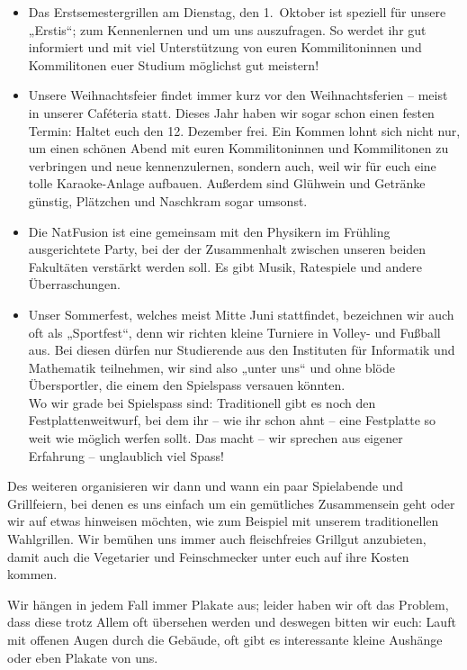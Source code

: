 \begin{itemize}
    \item Das Erstsemestergrillen am Dienstag, den 1.~Oktober ist speziell für unsere „Erstis“; zum Kennenlernen und um uns auszufragen.
          So werdet ihr gut informiert und mit viel Unterstützung von euren Kommilitoninnen und Kommilitonen euer Studium möglichst gut meistern!
    \item Unsere Weihnachtsfeier findet immer kurz vor den Weihnachtsferien -- meist in unserer Caféteria statt.
          Dieses Jahr haben wir sogar schon einen festen Termin: Haltet euch den 12. Dezember frei.
          Ein Kommen lohnt sich nicht nur, um einen schönen Abend mit euren Kommilitoninnen und Kommilitonen zu verbringen und neue kennenzulernen,
          sondern auch, weil wir für euch eine tolle Karaoke-Anlage aufbauen.
          Außerdem sind Glühwein und Getränke günstig, Plätzchen und Naschkram sogar umsonst.
    \item Die NatFusion ist eine gemeinsam mit den Physikern im Frühling ausgerichtete Party,
          bei der der Zusammenhalt zwischen unseren beiden Fakultäten verstärkt werden soll.
          Es gibt Musik, Ratespiele und andere Überraschungen.
    \item Unser Sommerfest, welches meist Mitte Juni stattfindet, bezeichnen wir auch oft als „Sportfest“,
          denn wir richten kleine Turniere in Volley- und Fußball aus.
          Bei diesen dürfen nur Studierende aus den Instituten für Informatik und Mathematik teilnehmen, wir sind also „unter uns“
          und ohne blöde Übersportler, die einem den Spielspass versauen könnten.\\
          Wo wir grade bei Spielspass sind: Traditionell gibt es noch den Festplattenweitwurf,
          bei dem ihr -- wie ihr schon ahnt -- eine Festplatte so weit wie möglich werfen sollt.
          Das macht -- wir sprechen aus eigener Erfahrung -- unglaublich viel Spass!
\end{itemize}

Des weiteren organisieren wir dann und wann ein paar Spielabende und Grillfeiern, bei denen es uns einfach um ein gemütliches Zusammensein geht oder wir auf etwas hinweisen möchten, wie zum Beispiel mit unserem traditionellen Wahlgrillen.
Wir bemühen uns immer auch fleischfreies Grillgut anzubieten, damit auch die Vegetarier und Feinschmecker unter euch auf ihre Kosten kommen.

Wir hängen in jedem Fall immer Plakate aus; leider haben wir oft das Problem, dass diese trotz Allem oft übersehen werden und deswegen bitten wir euch:
Lauft mit offenen Augen durch die Gebäude, oft gibt es interessante kleine Aushänge oder eben Plakate von uns.


